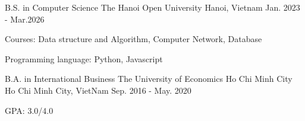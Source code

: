 \begin{cventries} %
  \cventry
    {B.S. in Computer Science} %
    {The Hanoi Open University } %
    {Hanoi, Vietnam} %
    {Jan. 2023 - Mar.2026} %
    {
      \begin{cvitems} %
        \item {Courses: Data structure and Algorithm, Computer Network, Database}
        \item {Programming language: Python, Javascript}
      \end{cvitems}
    }

   \cventry
    {B.A. in International Business} %
    {The University of Economics Ho Chi Minh City} %
    {Ho Chi Minh City, VietNam} %
    {Sep. 2016 - May. 2020} %
    {
      \begin{cvitems} %
        \item {GPA: 3.0/4.0}
      \end{cvitems}
    }

\end{cventries}
